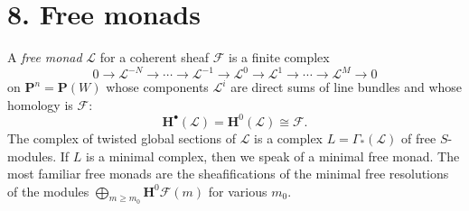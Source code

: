 \documentclass{tran-l}
\newcommand{\F}{\mathcal{F}}
\newcommand{\myH}{\mathbf{H}}
\newcommand{\PP}{\mathbf{P}}
\theoremstyle{plain}
\theoremstyle{remark}
\theoremstyle{definition}
\begin{document}
\section*{8. Free monads}

A {\em free monad} $\mathcal{L}$ for a coherent sheaf $\F $ is a finite complex
\begin{equation*}0 \to \mathcal{L}^{-N} \to \cdots \to \mathcal{L}^{-1} \to 
\mathcal{L}^{0} \to \mathcal{L}^{1} \to \cdots \to \mathcal{L}^{M} \to 0\end{equation*}
on $\PP ^{n}=\PP (W)$ whose components $\mathcal{L}^{i}$ are direct sums of line bundles and whose homology
is $\F $:
\begin{equation*}\myH ^{\bullet }(\mathcal{L})=\myH ^{0}(\mathcal{L}) \cong \F .\end{equation*}
The complex of twisted global sections of $\mathcal{L}$ is a complex $L= \Gamma _{*}(\mathcal{L})$
of free $S$-modules. If $L$ is a minimal complex,  then we speak of a
minimal free  monad. The most familiar free monads are the sheafifications of the
minimal free resolutions of the modules $\bigoplus _{m\geq m_{0}}\myH ^{0}\F (m)$
for various $m_{0}$.
\end{document}
